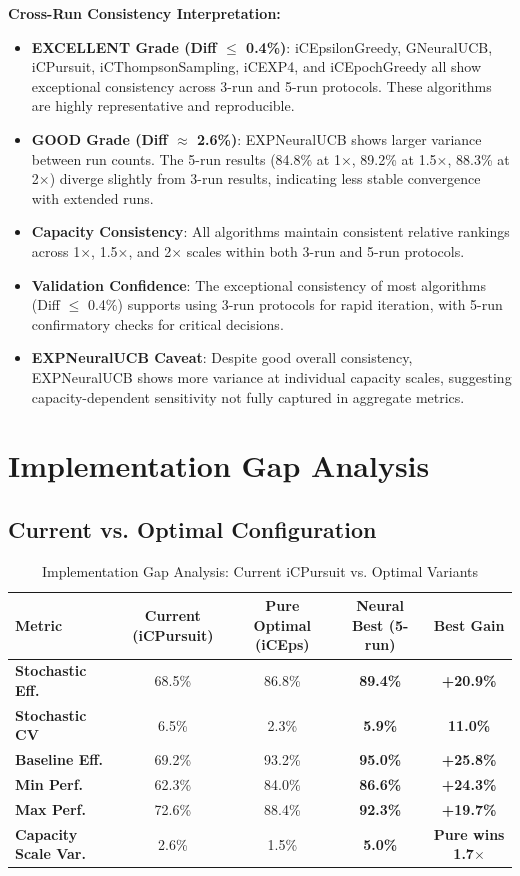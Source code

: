 \documentclass[12pt,a4paper]{article}
\newcommand{\success}[1]{\textcolor{accentgreen}{\textbf{#1}}}
\newcommand{\warning}[1]{\textcolor{warningred}{\textbf{#1}}}
\newcommand{\legacy}[1]{\textcolor{legacycolor}{\textbf{#1}}}
\newcommand{\neural}[1]{\textcolor{neuralcolor}{\textbf{#1}}}
\begin{document}
\textbf{Cross-Run Consistency Interpretation:}
\begin{itemize}
\item \success{EXCELLENT Grade (Diff $\leq$ 0.4\%)}: iCEpsilonGreedy, GNeuralUCB, iCPursuit, iCThompsonSampling, iCEXP4, and iCEpochGreedy all show exceptional consistency across 3-run and 5-run protocols. These algorithms are highly representative and reproducible.
\item \legacy{GOOD Grade (Diff $\approx$ 2.6\%)}: EXPNeuralUCB shows larger variance between run counts. The 5-run results (84.8\% at 1$\times$, 89.2\% at 1.5$\times$, 88.3\% at 2$\times$) diverge slightly from 3-run results, indicating less stable convergence with extended runs.
\item \success{Capacity Consistency}: All algorithms maintain consistent relative rankings across 1$\times$, 1.5$\times$, and 2$\times$ scales within both 3-run and 5-run protocols.
\item \success{Validation Confidence}: The exceptional consistency of most algorithms (Diff $\leq$ 0.4\%) supports using 3-run protocols for rapid iteration, with 5-run confirmatory checks for critical decisions.
\item \warning{EXPNeuralUCB Caveat}: Despite good overall consistency, EXPNeuralUCB shows more variance at individual capacity scales, suggesting capacity-dependent sensitivity not fully captured in aggregate metrics.
\end{itemize}

\section{Implementation Gap Analysis}

\subsection{Current vs. Optimal Configuration}

\begin{table}[H]
\centering
\caption{Implementation Gap Analysis: Current iCPursuit vs. Optimal Variants}
\label{tab:implementation-gap}
\begin{tabular}{@{}lcccc@{}}
\toprule
\textbf{Metric} & \textbf{Current (iCPursuit)} & \textbf{Pure Optimal (iCEps)} & \textbf{Neural Best (5-run)} & \textbf{Best Gain} \\
\midrule
\warning{Stochastic Eff.} & 68.5\% & 86.8\% & \neural{89.4\%} & \neural{+20.9\%} \\
\warning{Stochastic CV} & 6.5\% & 2.3\% & \neural{5.9\%} & \neural{11.0\%} \\
\warning{Baseline Eff.} & 69.2\% & 93.2\% & \neural{95.0\%} & \neural{+25.8\%} \\
\warning{Min Perf.} & 62.3\% & 84.0\% & \neural{86.6\%} & \neural{+24.3\%} \\
\warning{Max Perf.} & 72.6\% & 88.4\% & \neural{92.3\%} & \neural{+19.7\%} \\
\midrule
\warning{Capacity Scale Var.} & 2.6\% & 1.5\% & \neural{5.0\%} & \neural{Pure wins 1.7$\times$} \\
\bottomrule
\end{tabular}
\end{table}
\end{document}
